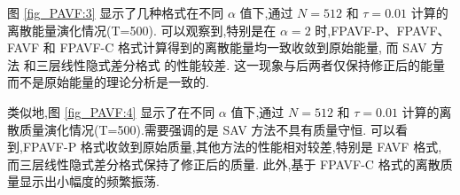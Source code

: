 图 \ref{fig_PAVF:3} 显示了几种格式在不同 $\alpha$ 值下,通过 $N=512$ 和 $\tau=0.01$ 计算的离散能量演化情况(T=500).
可以观察到,特别是在 $\alpha=2$ 时,FPAVF-P、FPAVF、FAVF 和 FPAVF-C 格式计算得到的离散能量均一致收敛到原始能量,
而 SAV 方法 \cite{chengConvergenceEnergyconservingScheme2022} 和三层线性隐式差分格式 \cite{ranLinearlyImplicitConservative2016} 的性能较差.
这一现象与后两者仅保持修正后的能量而不是原始能量的理论分析是一致的.

	类似地,图 \ref{fig_PAVF:4} 显示了在不同 $\alpha$ 值下,通过 $N=512$ 和 $\tau=0.01$ 计算的离散质量演化情况(T=500).需要强调的是 SAV 方法不具有质量守恒.
可以看到,FPAVF-P 格式收敛到原始质量,其他方法的性能相对较差,特别是 FAVF 格式,而三层线性隐式差分格式保持了修正后的质量.
此外,基于 FPAVF-C 格式的离散质量显示出小幅度的频繁振荡.


\begin{figure}[H]
	\begin{center}
	 \\
\end{center}
\end{figure}
